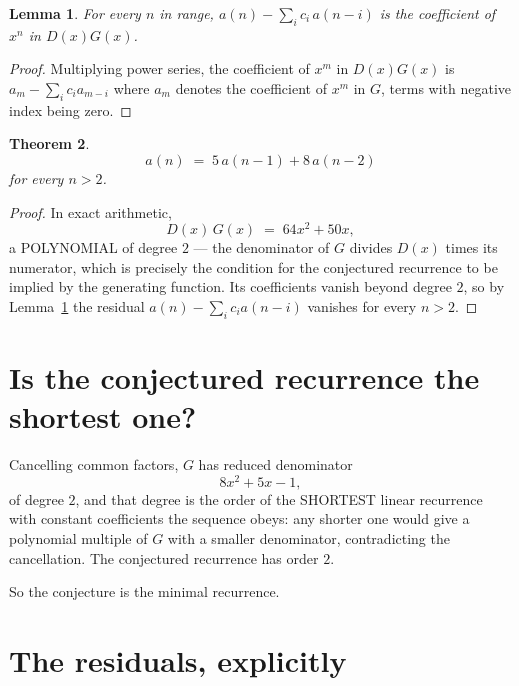 \documentclass[11pt,a4paper]{article}
\theoremstyle{plain}
\newtheorem{theorem}{Theorem}
\newtheorem{lemma}[theorem]{Lemma}
\theoremstyle{definition}
\begin{document}
\begin{lemma}\label{lem:key}
For every $n$ in range, $a(n)-\sum_i c_i\,a(n-i)$ is the coefficient of $x^{n}$ in
$D(x)G(x)$.
\end{lemma}

\begin{proof}
Multiplying power series, the coefficient of $x^{m}$ in $D(x)G(x)$ is
$a_m-\sum_i c_i a_{m-i}$ where $a_m$ denotes the coefficient of $x^{m}$ in $G$, terms with
negative index being zero.
\end{proof}

\begin{theorem}
\[
a(n)\;=\;5\,a(n-1) + 8\,a(n-2)
\]
for every $n>2$.
\end{theorem}

\begin{proof}
In exact arithmetic,
\[
D(x)\,G(x)\;=\;64 x^{2} + 50 x,
\]
a POLYNOMIAL of degree $2$ --- the denominator of $G$ divides $D(x)$ times its numerator,
which is precisely the condition for the conjectured recurrence to be implied by the
generating function. Its coefficients vanish beyond degree $2$, so by
Lemma~\ref{lem:key} the residual $a(n)-\sum_ic_ia(n-i)$ vanishes for every
$n>2$.
\end{proof}

\section{Is the conjectured recurrence the shortest one?}

Cancelling common factors, $G$ has reduced denominator
\[
8 x^{2} + 5 x - 1,
\]
of degree $2$, and that degree is the order of the SHORTEST linear recurrence with
constant coefficients the sequence obeys: any shorter one would give a polynomial multiple of
$G$ with a smaller denominator, contradicting the cancellation. The conjectured recurrence has
order $2$.

So the conjecture is the minimal recurrence.

\section{The residuals, explicitly}
\end{document}
